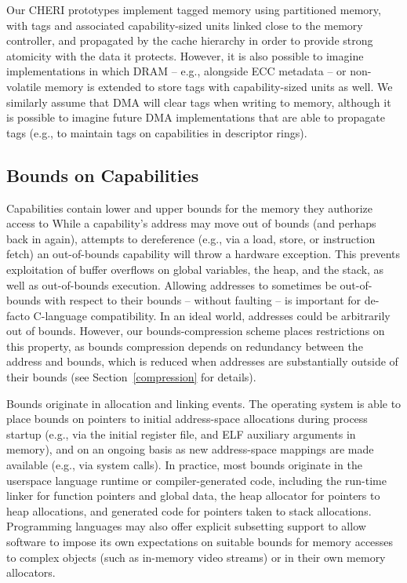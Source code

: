 Our CHERI 
prototypes implement tagged memory using partitioned memory, with tags and
associated capability-sized units linked close to the memory controller, and
propagated by the cache hierarchy in order to provide strong atomicity with
the data it protects.
However, it is also possible to imagine implementations in which DRAM --
e.g., alongside ECC metadata -- or
non-volatile memory is extended to store tags with capability-sized units as
well.
We similarly assume that DMA will clear tags when writing to memory, although
it is possible to imagine future DMA implementations that are able to
propagate tags (e.g., to maintain tags on capabilities in descriptor rings).

\subsection{Bounds on Capabilities}
\label{sec:model-bounds}

Capabilities contain lower and upper bounds for the memory they authorize
access to
While a capability's address may move out of bounds (and perhaps back in
again), attempts to dereference (e.g., via a load, store, or instruction
fetch) an out-of-bounds capability will throw a hardware exception.
This prevents exploitation of buffer overflows on global variables, the heap,
and the stack, as well as out-of-bounds execution.
Allowing addresses to sometimes be out-of-bounds with respect to their
bounds -- without faulting -- is important for de-facto C-language
compatibility.
In an ideal world, addresses could be arbitrarily out of bounds.
However, our
bounds-compression scheme places restrictions on this property, as bounds
compression depends on redundancy between the address and bounds, which is
reduced when addresses are substantially outside of their bounds (see
Section~\ref{compression} for details).

Bounds originate in allocation and linking events.
The operating system is able to place bounds on pointers to initial
address-space
allocations during process startup (e.g., via the initial register file, and
ELF auxiliary arguments in memory), and on an ongoing basis as new address-space
mappings are made available (e.g., via  system calls).
In practice, most bounds originate in the userspace language runtime or
compiler-generated
code, including the run-time linker for function pointers and global data,
the heap allocator for pointers to heap allocations, and generated code for
pointers taken to stack allocations.
 Programming languages may also offer explicit subsetting support to allow
software to impose its own expectations on suitable bounds for memory accesses
to complex objects (such as in-memory video streams) or in their own memory
allocators.

